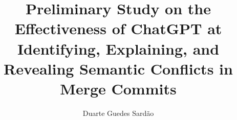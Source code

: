 \documentclass[11pt,a4paper]{report}
\begin{document}
\title{Preliminary Study on the Effectiveness of ChatGPT at Identifying, Explaining,
and Revealing Semantic Conflicts in Merge Commits}
\author{Duarte Guedes Sardão}











\begin{Prolog}
  \cleardoublepage
  \tableofcontents
  \cleardoublepage
  \listoffigures
  \cleardoublepage
  \listoftables
\end{Prolog}

\StartBody






\end{document}
